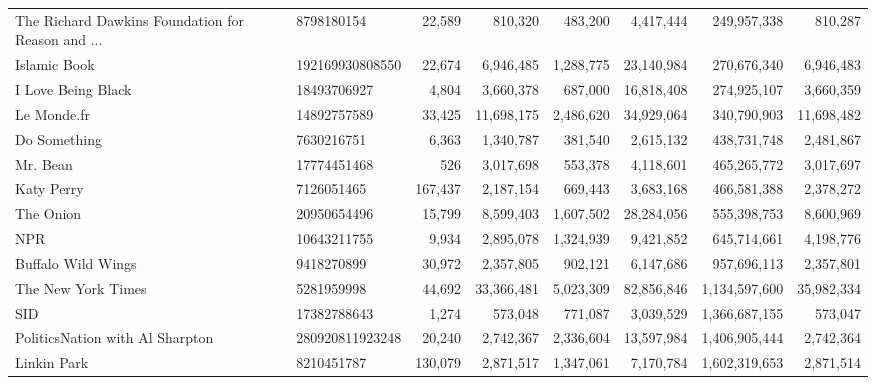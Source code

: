 \begin{longtable}{llrrrrrr}
 The Richard Dawkins Foundation for Reason and ... &       8798180154 &  22,589 &     810,320 &    483,200 &   4,417,444 &   249,957,338 &    810,287 \\
                                      Islamic Book &  192169930808550 &  22,674 &   6,946,485 &  1,288,775 &  23,140,984 &   270,676,340 &  6,946,483 \\
                                I Love Being Black &      18493706927 &   4,804 &   3,660,378 &    687,000 &  16,818,408 &   274,925,107 &  3,660,359 \\
                                       Le Monde.fr &      14892757589 &  33,425 &  11,698,175 &  2,486,620 &  34,929,064 &   340,790,903 & 11,698,482 \\
                                      Do Something &       7630216751 &   6,363 &   1,340,787 &    381,540 &   2,615,132 &   438,731,748 &  2,481,867 \\
                                          Mr. Bean &      17774451468 &     526 &   3,017,698 &    553,378 &   4,118,601 &   465,265,772 &  3,017,697 \\
                                        Katy Perry &       7126051465 & 167,437 &   2,187,154 &    669,443 &   3,683,168 &   466,581,388 &  2,378,272 \\
                                         The Onion &      20950654496 &  15,799 &   8,599,403 &  1,607,502 &  28,284,056 &   555,398,753 &  8,600,969 \\
                                               NPR &      10643211755 &   9,934 &   2,895,078 &  1,324,939 &   9,421,852 &   645,714,661 &  4,198,776 \\
                                Buffalo Wild Wings &       9418270899 &  30,972 &   2,357,805 &    902,121 &   6,147,686 &   957,696,113 &  2,357,801 \\
                                The New York Times &       5281959998 &  44,692 &  33,366,481 &  5,023,309 &  82,856,846 & 1,134,597,600 & 35,982,334 \\
                                               SID &      17382788643 &   1,274 &     573,048 &    771,087 &   3,039,529 & 1,366,687,155 &    573,047 \\
                   PoliticsNation with Al Sharpton &  280920811923248 &  20,240 &   2,742,367 &  2,336,604 &  13,597,984 & 1,406,905,444 &  2,742,364 \\
                                       Linkin Park &       8210451787 & 130,079 &   2,871,517 &  1,347,061 &   7,170,784 & 1,602,319,653 &  2,871,514 \\

\end{longtable}

